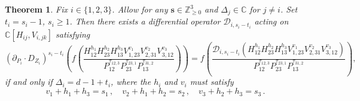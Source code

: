 \documentclass[12pt,a4paper]{extarticle}
\newtheorem{theorem}{Theorem}[section]
\theoremstyle{definition}
\begin{document}
\begin{theorem}\label{thm: diff op 1}
Fix $i\in\{1,2,3\}$. Allow for any $\mathbf{s}\in\mathbb{Z}_{\geq 0}^3$ and $\Delta_{j}\in\mathbb{C}$ for $j\neq i$. Set $t_i=s_i-1$, $s_i\ge1$. Then there exists a differential operator $\mathcal{D}_{i,s_i-t_i}$ acting on $\mathbb{C}[H_{ij},V_{i,jk}]$ satisfying
\begin{equation*}
(\partial_{P_i}\cdot D_{Z_i})^{s_i-t_i}\left(f\left(\frac{H^{h_{1}}_{12}H^{h_{2}}_{23}H^{h_{3}}_{13}V^{v_1}_{1,23}V^{v_2}_{2,31}V^{v_3}_{3,12}}{P^{\tau_{12,3}}_{12}P^{\tau_{23,1}}_{23}P^{\tau_{31,2}}_{13}}\right)\right)=f\left(\frac{\mathcal{D}_{i,s_i-t_i}(H^{h_1}_{12}H^{h_2}_{23}H^{h_3}_{13}V^{v_1}_{1,23}V^{v_2}_{2,31}V^{v_3}_{3,12})}{P^{\tau_{12,3}}_{12}P^{\tau_{23,1}}_{23}P^{\tau_{31,2}}_{13}}\right),
\end{equation*}
if and only if $\Delta_i=d-1+t_i$, where the $h_i$ and $v_i$ must satisfy
\begin{equation}
    v_1+h_1+h_3=s_1\,,\quad v_2+h_1+h_2=s_2\,,\quad 
    v_3+h_2+h_3=s_3\,.
\end{equation}
\end{theorem}
\end{document}
